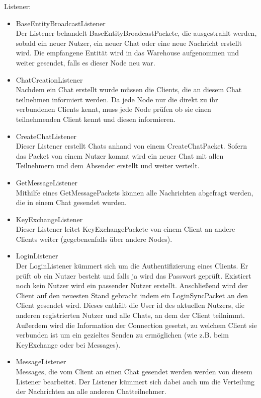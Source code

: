 \documentclass[a4paper]{article}
\theoremstyle{definition}
\begin{document}
    Listener:
    \begin{itemize}
        \item BaseEntityBroadcastListener\\
            Der Listener behandelt BaseEntityBroadcastPackete, die ausgestrahlt werden, sobald ein neuer Nutzer, ein neuer Chat oder eine neue Nachricht erstellt wird. Die empfangene Entität wird in das Warehouse aufgenommen und weiter gesendet, falls es dieser Node neu war.
        \item ChatCreationListener\\
            Nachdem ein Chat erstellt wurde müssen die Clients, die an diesem Chat teilnehmen informiert werden. Da jede Node nur die direkt zu ihr verbundenen Clients kennt, muss jede Node prüfen ob sie einen teilnehmenden Client kennt und diesen informieren. 
        \item CreateChatListener\\
            Dieser Listener erstellt Chats anhand von einem CreateChatPacket. Sofern das Packet von einem Nutzer kommt wird ein neuer Chat mit allen Teilnehmern und dem Absender erstellt und weiter verteilt.
        \item GetMessageListener\\
            Mithilfe eines GetMessagePackets können alle Nachrichten abgefragt werden, die in einem Chat gesendet wurden.
        \item KeyExchangeListener\\
            Dieser Listener leitet KeyExchangePackete von einem Client an andere Clients weiter (gegebenenfalls über andere Nodes).
        \item LoginListener\\
            Der LoginListener kümmert sich um die Authentifizierung eines Clients. Er prüft ob ein Nutzer besteht und falls ja wird das Passwort geprüft. Existiert noch kein Nutzer wird ein passender Nutzer erstellt. Anschließend wird der Client auf den neuesten Stand gebracht indem ein LoginSyncPacket an den Client gesendet wird. Dieses enthält die User id des aktuellen Nutzers, die anderen registrierten Nutzer und alle Chats, an dem der Client teilnimmt. Außerdem wird die Information der Connection gesetzt, zu welchem Client sie verbunden ist um ein gezieltes Senden zu ermöglichen (wie z.B. beim KeyExchange oder bei Messages).
        \item MessageListener\\
            Messages, die vom Client an einen Chat gesendet werden werden von diesem Listener bearbeitet. Der Listener kümmert sich dabei auch um die Verteilung der Nachrichten an alle anderen Chatteilnehmer.

\end{itemize}
\end{document}
